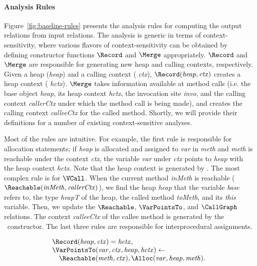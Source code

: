 {\paragraph{Analysis Rules}
Figure~\ref{fig:baseline-rules} presents the analysis rules for
computing the output relations from input relations.  The analysis is
generic in terms of context-sensitivity, where various flavors of
context-sensitivity can be obtained by defining constructor functions
$\Record$ and $\Merge$ appropriately. $\Record$ and $\Merge$ are
responsible for generating new heap and calling contexts,
respectively. Given a heap ({\it heap}) and a calling context ({\it
  ctx}), $\Record({\it heap}, {\it ctx})$ creates a heap context ({\it
  hctx}). $\Merge$ takes information available at method calls
(i.e. the base object {\it heap}, its heap context {\it hctx}, the
invocation site {\it invo}, and the calling context {\it callerCtx}
under which the method call is being made), and creates the calling
context {\it calleeCtx} for the called method. Shortly, we will
provide their definitions for a number of existing context-sensitive
analyses.

Most of the rules are intuitive. For example, the first rule is
responsible for allocation statements; if {\it heap} is allocated and
assigned to {\it var} in {\it meth} and {\it meth} is reachable under
the context {\it ctx}, the variable {\it var} under {\it ctx} points
to {\it heap} with the heap context {\it hctx}. Note that the heap
context is generated by \Record. The most complex rule is for
$\VCall$. When the current method {\it inMeth} is reachable
($\Reachable({\it inMeth}, {\it callerCtx})$), we find the heap {\it
  heap} that the variable {\it base} refers to, the type {\it heapT}
of the heap, the called method {\it toMeth}, and its {\it this}
variable. Then, we update the $\Reachable$, $\VarPointsTo$, and
$\CallGraph$ relations. The context {\it calleeCtx} of the callee
method is generated by the \Merge~constructor. The last three rules
are responsible for interprocedural assignments. 

\begin{figure}[t]
\[
  \begin{array}{l}
    \Record({\it heap}, {\it ctx}) = {\it hctx}, \\
    \VarPointsTo({\it var}, {\it ctx}, {\it heap}, {\it hctx}) \leftarrow \\
    \quad  \Reachable({\it meth}, {\it ctx}),
    \Alloc({\it var}, {\it heap}, {\it meth}). \\[1em]


\end{array}\]
\end{figure}}
